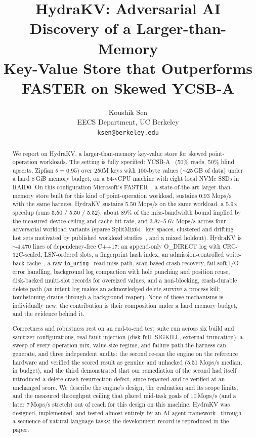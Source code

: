 \documentclass{article}
\title{HydraKV: Adversarial AI Discovery of a Larger-than-Memory\\
       Key-Value Store that Outperforms FASTER on Skewed YCSB-A}
\author{%
  Koushik Sen \\
  EECS Department, UC Berkeley \\
  \texttt{ksen@berkeley.edu} \\
}
\newcommand{\FASTERBase}{0.93}          %
\newcommand{\SpeedupFinal}{5.9$\times$}
\newcommand{\HydraAuditVerified}{5.51}  %
\newcommand{\HydraFinalWL}{5.50}        %
\newcommand{\HydraFinalWLRuns}{5.50 / 5.50 / 5.52}
\newcommand{\EngineLocFinal}{$\sim$4{,}470}
\newcommand{\NKeysShort}{250M}
\newcommand{\ValueBytes}{100}
\newcommand{\MemBudget}{8\,GiB}
\newcommand{\DataSize}{$\sim$25\,GB}
\begin{document}
\maketitle

\begin{abstract}
We report on HydraKV, a larger-than-memory key-value store for skewed point-operation workloads. The setting is fully specified: YCSB-A~\cite{ycsb} (50\% reads, 50\% blind upserts, Zipfian $\theta=0.95$) over \NKeysShort{} keys with \ValueBytes-byte values (\DataSize{} of data) under a hard \MemBudget{} memory budget, on a 64-vCPU machine with eight local NVMe SSDs in RAID0. On this configuration Microsoft's FASTER~\cite{faster}, a state-of-the-art larger-than-memory store built for this kind of point-operation workload, sustains \FASTERBase{} Mops/s with the same harness. HydraKV sustains \HydraFinalWL{} Mops/s on the same workload, a \SpeedupFinal{} speedup (runs \HydraFinalWLRuns), about 89\% of the miss-bandwidth bound implied by the measured device ceiling and cache-hit rate, and 3.87--5.67 Mops/s across four adversarial workload variants (sparse SplitMix64~\cite{splitmix} key spaces, clustered and drifting hot sets motivated by published workload studies~\cite{cao-fast20,yang-osdi20}, and a mixed holdout). HydraKV is \EngineLocFinal{} lines of dependency-free C++17: an append-only O\_DIRECT log with CRC-32C-sealed, LSN-ordered slots, a fingerprint hash index, an admission-controlled write-back cache~\cite{slru,tinylfu}, a raw \texttt{io\_uring}~\cite{iouring} read-miss path, scan-based crash recovery, fail-soft I/O error handling, background log compaction with hole punching and position reuse, disk-backed multi-slot records for oversized values, and a non-blocking, crash-durable delete path (an intent log makes an acknowledged delete survive a process kill; tombstoning drains through a background reaper). None of these mechanisms is individually new; the contribution is their composition under a hard memory budget, and the evidence behind it.

Correctness and robustness rest on an end-to-end test suite run across six build and sanitizer configurations, real fault injection (disk-full, SIGKILL, external truncation), a sweep of every operation mix, value-size regime, and failure path the harness can generate, and three independent audits: the second re-ran the engine on the reference hardware and verified the scored result as genuine and unhacked (\HydraAuditVerified{} Mops/s median, in budget), and the third demonstrated that our remediation of the second had itself introduced a delete crash-resurrection defect, since repaired and re-verified at an unchanged score. We describe the engine's design, the evaluation and its scope limits, and the measured throughput ceiling that placed mid-task goals of 10\,Mops/s (and a later 7\,Mops/s stretch) out of reach for this design on this machine. HydraKV was designed, implemented, and tested almost entirely by an AI agent framework~\cite{kisssorcar} through a sequence of natural-language tasks; the development record is reproduced in the paper.
\end{abstract}
\end{document}
